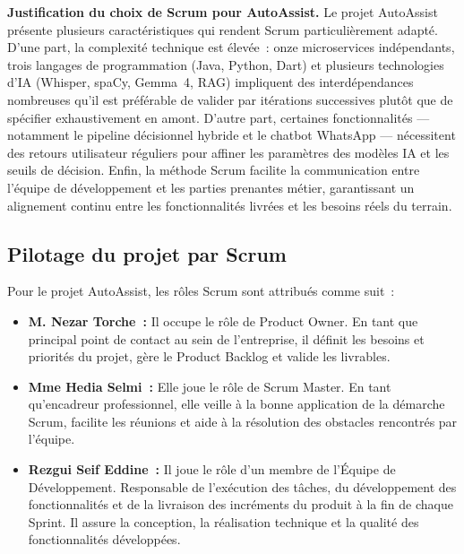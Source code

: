 \indent \textbf{Justification du choix de Scrum pour AutoAssist.} Le projet AutoAssist pr\'{e}sente plusieurs caract\'{e}ristiques qui rendent Scrum particuli\`{e}rement adapt\'{e}. D'une part, la complexit\'{e} technique est \'{e}lev\'{e}e~: onze microservices ind\'{e}pendants, trois langages de programmation (Java, Python, Dart) et plusieurs technologies d'IA (Whisper, spaCy, Gemma~4, RAG) impliquent des interd\'{e}pendances nombreuses qu'il est pr\'{e}f\'{e}rable de valider par it\'{e}rations successives plut\^{o}t que de sp\'{e}cifier exhaustivement en amont. D'autre part, certaines fonctionnalit\'{e}s --- notamment le pipeline d\'{e}cisionnel hybride et le chatbot WhatsApp --- n\'{e}cessitent des retours utilisateur r\'{e}guliers pour affiner les param\`{e}tres des mod\`{e}les IA et les seuils de d\'{e}cision. Enfin, la m\'{e}thode Scrum facilite la communication entre l'\'{e}quipe de d\'{e}veloppement et les parties prenantes m\'{e}tier, garantissant un alignement continu entre les fonctionnalit\'{e}s livr\'{e}es et les besoins r\'{e}els du terrain.

\subsection{Pilotage du projet par Scrum}

Pour le projet AutoAssist, les r\^{o}les Scrum sont attribu\'{e}s comme suit~:

\begin{itemize}[label=---]
    \item \textbf{M. Nezar Torche~:} Il occupe le r\^{o}le de Product Owner. En tant que principal point de contact au sein de l'entreprise, il d\'{e}finit les besoins et priorit\'{e}s du projet, g\`{e}re le Product Backlog et valide les livrables.
    \item \textbf{Mme Hedia Selmi~:} Elle joue le r\^{o}le de Scrum Master. En tant qu'encadreur professionnel, elle veille \`{a} la bonne application de la d\'{e}marche Scrum, facilite les r\'{e}unions et aide \`{a} la r\'{e}solution des obstacles rencontr\'{e}s par l'\'{e}quipe.
    \item \textbf{Rezgui Seif Eddine~:} Il joue le r\^{o}le d'un membre de l'\'{E}quipe de D\'{e}veloppement. Responsable de l'ex\'{e}cution des t\^{a}ches, du d\'{e}veloppement des fonctionnalit\'{e}s et de la livraison des incr\'{e}ments du produit \`{a} la fin de chaque Sprint. Il assure la conception, la r\'{e}alisation technique et la qualit\'{e} des fonctionnalit\'{e}s d\'{e}velopp\'{e}es.
\end{itemize}

